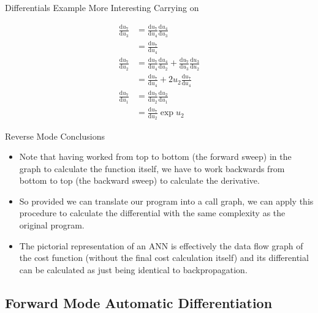 \documentclass{beamer}
\begin{document}
\begin{frame}[fragile]{Differentials Example More Interesting}
Carrying on

$$
\begin{aligned}
\frac{\mathrm{d}u_7}{\mathrm{d}u_3} &=
 \frac{\mathrm{d}u_7}{\mathrm{d}u_4}\frac{\mathrm{d}u_4}{\mathrm{d}u_3} \\
&= \frac{\mathrm{d}u_7}{\mathrm{d}u_4} \\
\frac{\mathrm{d}u_7}{\mathrm{d}u_2} &=
 \frac{\mathrm{d}u_7}{\mathrm{d}u_4}\frac{\mathrm{d}u_4}{\mathrm{d}u_2} +
 \frac{\mathrm{d}u_7}{\mathrm{d}u_3}\frac{\mathrm{d}u_3}{\mathrm{d}u_2} \\
&= \frac{\mathrm{d}u_7}{\mathrm{d}u_4} + 2u_2\frac{\mathrm{d}u_7}{\mathrm{d}u_4} \\
\frac{\mathrm{d}u_7}{\mathrm{d}u_1} &=
 \frac{\mathrm{d}u_7}{\mathrm{d}u_2}\frac{\mathrm{d}u_2}{\mathrm{d}u_1} \\
&=\frac{\mathrm{d}u_7}{\mathrm{d}u_2}\exp{u_2}
\end{aligned}
$$
\end{frame}

\begin{frame}[fragile]{Reverse Mode Conclusions}
\begin{itemize}
\item
Note that having worked from top to bottom (the forward sweep) in the
graph to calculate the function itself, we have to work backwards from
bottom to top (the backward sweep) to calculate the derivative.
\item
So provided we can translate our program into a call graph, we can
apply this procedure to calculate the differential with the same
complexity as the original program.
\item
The pictorial representation of an ANN is effectively the data flow
graph of the cost function (without the final cost calculation itself)
and its differential can be calculated as just being identical to
backpropagation.
\end{itemize}
\end{frame}

\subsection{Forward Mode Automatic Differentiation}
\end{document}
